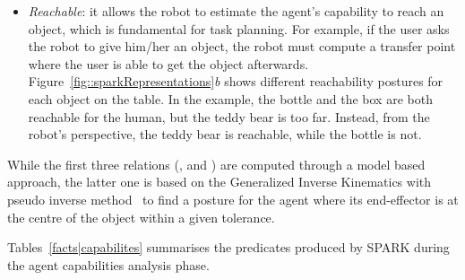 \begin{itemize}
\item \emph{Reachable}: it allows the robot to estimate the agent's capability
to reach an object, which is fundamental for task planning. For example, if the
user asks the robot to give him/her an object, the robot must compute a transfer
point where the user is able to get the object afterwards. 
Figure~\ref{fig::sparkRepresentations}\emph{b} shows different reachability postures for each object
on the table. In the example, the bottle and the box are both reachable for the
human, but the teddy bear is too far. Instead, from the robot's perspective,
the teddy bear is reachable, while the bottle is not.

\end{itemize}

\begin{figure*}[!t]
    \begin{center}
    \caption{(a) Field of view (FOV) and the field of attention (FOA) of the
    human. (b) Different reaching postures for the human.}
    \label{fig::sparkRepresentations}
    \end{center}
\end{figure*} 


While the first three relations (,  and
) are computed through a model based approach, the latter one
is based on the Generalized Inverse Kinematics with pseudo inverse
method~\cite{Nakamura90,Baerlocher04} to find a posture for the
agent where its end-effector is at the centre of the object within a given
tolerance.

Tables~\ref{facts|capabilites} summarises the predicates produced by SPARK
during the agent capabilities analysis phase.

